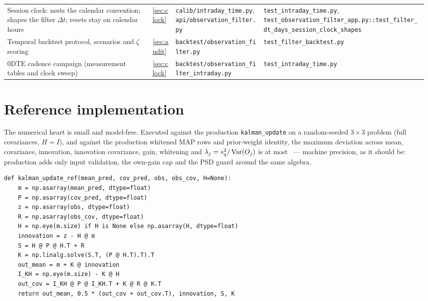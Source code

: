 \documentclass[11pt]{article}
\begin{document}
\begin{longtable}{@{}p{}p{}p{}p{}@{}}
Session clock: nests the calendar convention; shapes the filter
$\Delta t$; resets stay on calendar hours &
\cref{sec:clock} &
\nolinkurl{calib/intraday_time.py},
\nolinkurl{api/observation_filter.py} &
\nolinkurl{test_intraday_time.py},
\nolinkurl{test_observation_filter_app.py::test_filter_dt_days_session_clock_shapes}\\
Temporal backtest protocol, scenarios and $\zeta$ scoring &
\cref{sec:audit} &
\nolinkurl{backtest/observation_filter.py} &
\nolinkurl{test_filter_backtest.py}\\
0DTE cadence campaign (measurement tables and clock sweep) &
\cref{sec:clock} &
\nolinkurl{backtest/observation_filter_intraday.py} &
\nolinkurl{test_intraday_time.py}\\
\bottomrule
\end{longtable}
\endgroup

\section{Reference implementation}
\label{app:ref}

The numerical heart is small and model-free.  Executed against the
production \texttt{kalman\_update} on a random-seeded $3\times3$ problem
(full covariances, $H=I$), and against the production whitened MAP rows
and prior-weight identity, the maximum deviation across mean,
covariance, innovation, innovation covariance, gain, whitening and
$\lambda_j=s_q^2/\operatorname{Var}(O_j)$ is at most \ktrrefagree\ --- machine
precision, as it should be: production adds only input validation, the
own-gain cap and the PSD guard around the same algebra.

\begin{lstlisting}[caption={Covariance-form update with Joseph
covariance (verified against production; agreement stated above).}]
def kalman_update_ref(mean_pred, cov_pred, obs, obs_cov, H=None):
    m = np.asarray(mean_pred, dtype=float)
    P = np.asarray(cov_pred, dtype=float)
    z = np.asarray(obs, dtype=float)
    R = np.asarray(obs_cov, dtype=float)
    H = np.eye(m.size) if H is None else np.asarray(H, dtype=float)
    innovation = z - H @ m
    S = H @ P @ H.T + R
    K = np.linalg.solve(S.T, (P @ H.T).T).T
    out_mean = m + K @ innovation
    I_KH = np.eye(m.size) - K @ H
    out_cov = I_KH @ P @ I_KH.T + K @ R @ K.T
    return out_mean, 0.5 * (out_cov + out_cov.T), innovation, S, K
\end{lstlisting}
\end{document}
